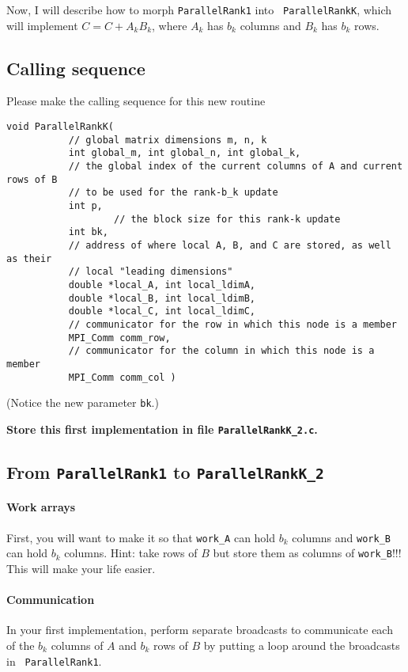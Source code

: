 \documentclass[10pt]{article}
\begin{document}
Now, I will describe how to morph {\tt ParallelRank1} into {\tt
  ParallelRankK}, which will implement 
$ C = C + A_k B_k $, where $ A_k $ has $ b_k $ columns and $ B_k $ has
$ b_k $ rows.

\subsection{Calling sequence}

Please make the calling sequence for this new routine
\begin{verbatim}
void ParallelRankK( 
		   // global matrix dimensions m, n, k
		   int global_m, int global_n, int global_k,  
		   // the global index of the current columns of A and current rows of B 
		   // to be used for the rank-b_k update
		   int p, 
                   // the block size for this rank-k update 
		   int bk, 
		   // address of where local A, B, and C are stored, as well as their 
		   // local "leading dimensions"
		   double *local_A, int local_ldimA, 
		   double *local_B, int local_ldimB, 
		   double *local_C, int local_ldimC,
		   // communicator for the row in which this node is a member
		   MPI_Comm comm_row, 
		   // communicator for the column in which this node is a member
		   MPI_Comm comm_col )
\end{verbatim}
(Notice the new parameter {\tt bk}.)

{\bf Store this first implementation in file {\tt ParallelRankK\_2.c}.}

\subsection{From {\tt ParallelRank1} to {\tt ParallelRankK\_2}}


\paragraph*{Work arrays}
 First, you will want to make it so that {\tt work\_A} can hold $ b_k $
columns and {\tt work\_B} can hold $ b_k $ columns.  Hint:  take rows
of $ B $ but store them as columns of {\tt work\_B}!!!  This will make
your life easier.

\paragraph*{Communication}
In your first implementation, perform separate
broadcasts to communicate each of the $ b_k $ columns of $ A$ and $
b_k $ rows of $ B $ by putting a loop around the broadcasts in {\tt
  ParallelRank1}.
\end{document}
